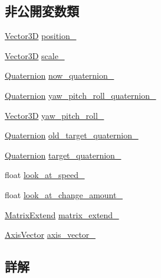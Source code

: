 \subsection*{非公開変数類}
\begin{DoxyCompactItemize}
\item 
\mbox{\hyperlink{class_vector3_d}{Vector3D}} \mbox{\hyperlink{class_transform_aa36f8a9ae39411699f7ff77f017f618a}{position\+\_\+}}
\item 
\mbox{\hyperlink{class_vector3_d}{Vector3D}} \mbox{\hyperlink{class_transform_ade54d2d37f01b20758b0ce11def76104}{scale\+\_\+}}
\item 
\mbox{\hyperlink{_vector3_d_8h_a3ee38c9c46d9851e33a9a1113328dafc}{Quaternion}} \mbox{\hyperlink{class_transform_a00d46dfb43b1e60b4f6ca8728d6aff54}{now\+\_\+quaternion\+\_\+}}
\item 
\mbox{\hyperlink{_vector3_d_8h_a3ee38c9c46d9851e33a9a1113328dafc}{Quaternion}} \mbox{\hyperlink{class_transform_ac9985a4b70b9af742c9f26f47784ba7b}{yaw\+\_\+pitch\+\_\+roll\+\_\+quaternion\+\_\+}}
\item 
\mbox{\hyperlink{class_vector3_d}{Vector3D}} \mbox{\hyperlink{class_transform_a725d32ecbcf8da99d63bb6296d9cd123}{yaw\+\_\+pitch\+\_\+roll\+\_\+}}
\item 
\mbox{\hyperlink{_vector3_d_8h_a3ee38c9c46d9851e33a9a1113328dafc}{Quaternion}} \mbox{\hyperlink{class_transform_a52fa2db52356033f42908fde94f9cb28}{old\+\_\+target\+\_\+quaternion\+\_\+}}
\item 
\mbox{\hyperlink{_vector3_d_8h_a3ee38c9c46d9851e33a9a1113328dafc}{Quaternion}} \mbox{\hyperlink{class_transform_acb5b22818929f01f4765a39f2da01579}{target\+\_\+quaternion\+\_\+}}
\item 
float \mbox{\hyperlink{class_transform_a762490e0b35915244f767d618bb875b4}{look\+\_\+at\+\_\+speed\+\_\+}}
\item 
float \mbox{\hyperlink{class_transform_acda35632e3895b925eaae4625c564b5f}{look\+\_\+at\+\_\+change\+\_\+amount\+\_\+}}
\item 
\mbox{\hyperlink{class_matrix_extend}{Matrix\+Extend}} \mbox{\hyperlink{class_transform_a150c78be6568eaf017165ff5c90d6928}{matrix\+\_\+extend\+\_\+}}
\item 
\mbox{\hyperlink{class_axis_vector}{Axis\+Vector}} \mbox{\hyperlink{class_transform_a2bde97ec180664c5587c445737c04cbe}{axis\+\_\+vector\+\_\+}}
\end{DoxyCompactItemize}


\subsection{詳解}


